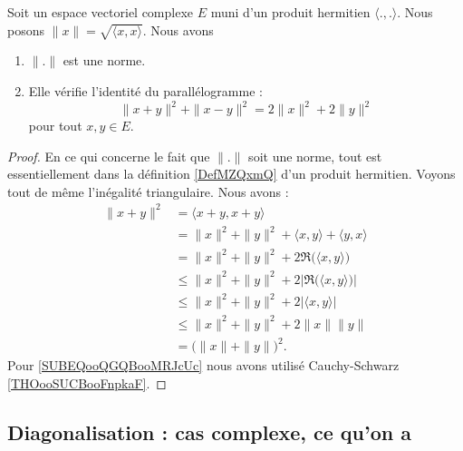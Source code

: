 \begin{proposition}        \label{PROPooSSYJooHAXAnC}
	Soit un espace vectoriel complexe \( E\) muni d'un produit hermitien \( \langle ., .\rangle \). Nous posons \( \| x \|=\sqrt{ \langle x, x\rangle  }\). Nous avons
	\begin{enumerate}
		\item
		      \( \| . \|\) est une norme.
		\item
		      Elle vérifie l'identité du parallélogramme :
		      \begin{equation}
			      \| x+y \|^2+\| x-y \|^2=2\| x \|^2+2\| y \|^2
		      \end{equation}
		      pour tout \( x,y\in E\).
	\end{enumerate}
\end{proposition}

\begin{proof}
	En ce qui concerne le fait que \( \| . \|\) soit une norme, tout est essentiellement dans la définition \ref{DefMZQxmQ} d'un produit hermitien. Voyons tout de même l'inégalité triangulaire. Nous avons :
	\begin{subequations}
		\begin{align}
			\| x+y \|^2 & =\langle x+y, x+y\rangle                                            \\
			            & =\| x \|^2+\| y \|^2+\langle x, y\rangle +\langle y, x\rangle       \\
			            & =\| x \|^2+\| y \|^2+2\Re\big( \langle x, y\rangle  \big)           \\
			            & \leq\| x \|^2+\| y \|^2+2|\Re\big( \langle x, y\rangle  \big)|      \\
			            & \leq\| x \|^2+\| y \|^2+2| \langle x, y\rangle  |                   \\
			            & \leq \| x \|^2+\| y \|^2+2\| x \|\| y \|\label{SUBEQooQGQBooMRJcUc} \\
			            & =\big( \| x \|+\| y \| \big)^2.
		\end{align}
	\end{subequations}
	Pour \eqref{SUBEQooQGQBooMRJcUc} nous avons utilisé Cauchy-Schwarz \ref{THOooSUCBooFnpkaF}.
\end{proof}

\subsection{Diagonalisation : cas complexe, ce qu'on a}

